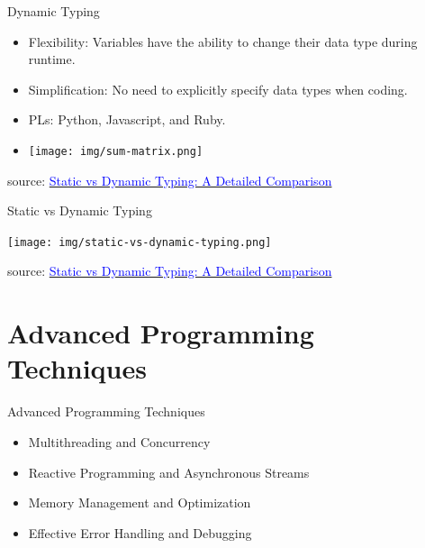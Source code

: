 \documentclass{beamer}
\begin{document}
\begin{frame}[t]{Dynamic Typing}
	\scriptsize
	\begin{itemize}
		\item<1-> Flexibility: Variables have the ability to change their data type during runtime.
		\item<2-> Simplification: No need to explicitly specify data types when coding.
		\item<3-> PLs: Python, Javascript, and Ruby.
		\item<4->[]
		\begin{center}
			\texttt{[image: img/sum-matrix.png]}
		\end{center}	
	\end{itemize}
	
	\tiny source: \href{https://www.bairesdev.com/blog/static-vs-dynamic-typing/} {\textcolor{blue}{Static vs Dynamic Typing: A Detailed Comparison}} 	
\end{frame}

\begin{frame}{Static vs Dynamic Typing}
		\begin{center}
			\texttt{[image: img/static-vs-dynamic-typing.png]}
		\end{center}	
	
	\tiny source: \href{https://www.bairesdev.com/blog/static-vs-dynamic-typing/} {\textcolor{blue}{Static vs Dynamic Typing: A Detailed Comparison}} 	
\end{frame}



\section{Advanced Programming Techniques}
\begin{frame}{Advanced Programming Techniques}
	\scriptsize
	\begin{itemize}
		\item<1-> Multithreading and Concurrency
		\item<2-> Reactive Programming and Asynchronous Streams
		\item<3-> Memory Management and Optimization
		\item<4-> Effective Error Handling and Debugging
	\end{itemize}
	\begin{center}
	\end{center}
\end{frame}
\end{document}
